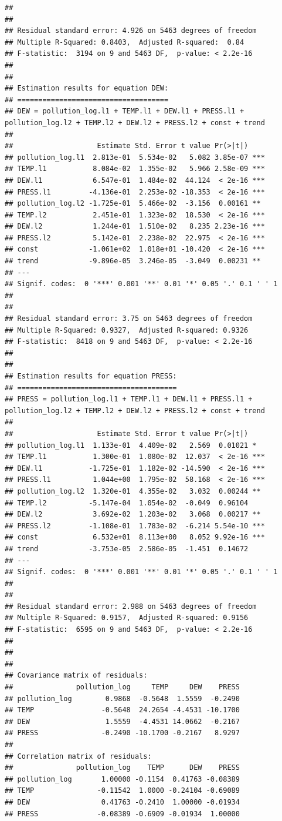 \documentclass[
]{article}
\begin{document}
\begin{verbatim}
## 
## 
## Residual standard error: 4.926 on 5463 degrees of freedom
## Multiple R-Squared: 0.8403,  Adjusted R-squared:  0.84 
## F-statistic:  3194 on 9 and 5463 DF,  p-value: < 2.2e-16 
## 
## 
## Estimation results for equation DEW: 
## ==================================== 
## DEW = pollution_log.l1 + TEMP.l1 + DEW.l1 + PRESS.l1 + pollution_log.l2 + TEMP.l2 + DEW.l2 + PRESS.l2 + const + trend 
## 
##                    Estimate Std. Error t value Pr(>|t|)    
## pollution_log.l1  2.813e-01  5.534e-02   5.082 3.85e-07 ***
## TEMP.l1           8.084e-02  1.355e-02   5.966 2.58e-09 ***
## DEW.l1            6.547e-01  1.484e-02  44.124  < 2e-16 ***
## PRESS.l1         -4.136e-01  2.253e-02 -18.353  < 2e-16 ***
## pollution_log.l2 -1.725e-01  5.466e-02  -3.156  0.00161 ** 
## TEMP.l2           2.451e-01  1.323e-02  18.530  < 2e-16 ***
## DEW.l2            1.244e-01  1.510e-02   8.235 2.23e-16 ***
## PRESS.l2          5.142e-01  2.238e-02  22.975  < 2e-16 ***
## const            -1.061e+02  1.018e+01 -10.420  < 2e-16 ***
## trend            -9.896e-05  3.246e-05  -3.049  0.00231 ** 
## ---
## Signif. codes:  0 '***' 0.001 '**' 0.01 '*' 0.05 '.' 0.1 ' ' 1
## 
## 
## Residual standard error: 3.75 on 5463 degrees of freedom
## Multiple R-Squared: 0.9327,  Adjusted R-squared: 0.9326 
## F-statistic:  8418 on 9 and 5463 DF,  p-value: < 2.2e-16 
## 
## 
## Estimation results for equation PRESS: 
## ====================================== 
## PRESS = pollution_log.l1 + TEMP.l1 + DEW.l1 + PRESS.l1 + pollution_log.l2 + TEMP.l2 + DEW.l2 + PRESS.l2 + const + trend 
## 
##                    Estimate Std. Error t value Pr(>|t|)    
## pollution_log.l1  1.133e-01  4.409e-02   2.569  0.01021 *  
## TEMP.l1           1.300e-01  1.080e-02  12.037  < 2e-16 ***
## DEW.l1           -1.725e-01  1.182e-02 -14.590  < 2e-16 ***
## PRESS.l1          1.044e+00  1.795e-02  58.168  < 2e-16 ***
## pollution_log.l2  1.320e-01  4.355e-02   3.032  0.00244 ** 
## TEMP.l2          -5.147e-04  1.054e-02  -0.049  0.96104    
## DEW.l2            3.692e-02  1.203e-02   3.068  0.00217 ** 
## PRESS.l2         -1.108e-01  1.783e-02  -6.214 5.54e-10 ***
## const             6.532e+01  8.113e+00   8.052 9.92e-16 ***
## trend            -3.753e-05  2.586e-05  -1.451  0.14672    
## ---
## Signif. codes:  0 '***' 0.001 '**' 0.01 '*' 0.05 '.' 0.1 ' ' 1
## 
## 
## Residual standard error: 2.988 on 5463 degrees of freedom
## Multiple R-Squared: 0.9157,  Adjusted R-squared: 0.9156 
## F-statistic:  6595 on 9 and 5463 DF,  p-value: < 2.2e-16 
## 
## 
## 
## Covariance matrix of residuals:
##               pollution_log     TEMP     DEW    PRESS
## pollution_log        0.9868  -0.5648  1.5559  -0.2490
## TEMP                -0.5648  24.2654 -4.4531 -10.1700
## DEW                  1.5559  -4.4531 14.0662  -0.2167
## PRESS               -0.2490 -10.1700 -0.2167   8.9297
## 
## Correlation matrix of residuals:
##               pollution_log    TEMP      DEW    PRESS
## pollution_log       1.00000 -0.1154  0.41763 -0.08389
## TEMP               -0.11542  1.0000 -0.24104 -0.69089
## DEW                 0.41763 -0.2410  1.00000 -0.01934
## PRESS              -0.08389 -0.6909 -0.01934  1.00000
\end{verbatim}
\end{document}
